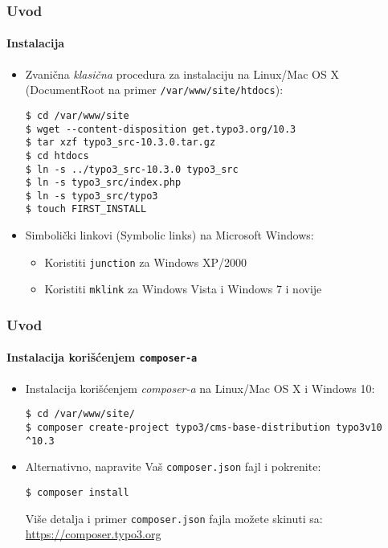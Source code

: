 
\begin{frame}[fragile]
	\frametitle{Uvod}
	\framesubtitle{Instalacija}

	\begin{itemize}
		\item Zvanična \textit{klasična} procedura za instalaciju na Linux/Mac OS X
			(DocumentRoot na primer \texttt{/var/www/site/htdocs}):
\begin{lstlisting}
$ cd /var/www/site
$ wget --content-disposition get.typo3.org/10.3
$ tar xzf typo3_src-10.3.0.tar.gz
$ cd htdocs
$ ln -s ../typo3_src-10.3.0 typo3_src
$ ln -s typo3_src/index.php
$ ln -s typo3_src/typo3
$ touch FIRST_INSTALL
\end{lstlisting}

		\item Simbolički linkovi (Symbolic links) na Microsoft Windows:

			\begin{itemize}
				\item Koristiti \texttt{junction} za Windows XP/2000
				\item Koristiti \texttt{mklink} za Windows Vista i Windows 7 i novije
			\end{itemize}

	\end{itemize}
\end{frame}


\begin{frame}[fragile]
	\frametitle{Uvod}
	\framesubtitle{Instalacija korišćenjem \texttt{composer-a}}

	\begin{itemize}
		\item Instalacija korišćenjem \textit{composer-a} na Linux/Mac OS X i Windows 10:
\begin{lstlisting}
$ cd /var/www/site/
$ composer create-project typo3/cms-base-distribution typo3v10 ^10.3
\end{lstlisting}

		\item Alternativno, napravite Vaš \texttt{composer.json} fajl i pokrenite:
\begin{lstlisting}
$ composer install
\end{lstlisting}

			Više detalja i primer \texttt{composer.json} fajla možete skinuti sa:
			\smaller
				\href{https://composer.typo3.org}{https://composer.typo3.org}
			\normalsize

	\end{itemize}
\end{frame}

